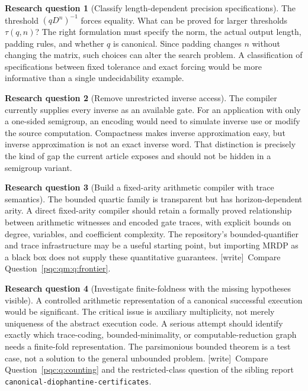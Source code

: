 \documentclass[11pt,letterpaper]{article}
\numberwithin{equation}{section}
\theoremstyle{definition}
\newtheorem{question}{Research question}
\theoremstyle{remark}
\newcommand{\code}[1]{\nolinkurl{#1}}
\newcommand{\wtag}{\textup{[write]}}
\begin{document}
\begin{question}[Classify length-dependent precision specifications]
\label{pqc:dr:q:precision}
The threshold $(qD^n)^{-1}$ forces equality. What can be proved for larger
thresholds $\tau(q,n)$? The right formulation must specify the norm,
the actual output length, padding rules, and whether $q$ is canonical.
Since padding changes $n$ without changing the matrix, such choices can
alter the search problem. A classification of specifications between
fixed tolerance and exact forcing would be more informative than a
single undecidability example.
\end{question}

\begin{question}[Remove unrestricted inverse access]
\label{pqc:dr:q:inverse}
The compiler currently supplies every inverse as an available gate. For
an application with only a one-sided semigroup, an encoding would need
to simulate inverse use or modify the source computation. Compactness
makes inverse approximation easy, but inverse approximation is not an
exact inverse word. That distinction is precisely the kind of gap the
current article exposes and should not be hidden in a semigroup variant.
\end{question}

\begin{question}[Build a fixed-arity arithmetic compiler with trace semantics]
\label{pqc:dr:q:fixedarity}
The bounded quartic family is transparent but has horizon-dependent
arity. A direct fixed-arity compiler should retain a formally proved
relationship between arithmetic witnesses and encoded gate traces,
with explicit bounds on degree, variables, and coefficient complexity.
The repository's bounded-quantifier and trace infrastructure may be a
useful starting point, but importing MRDP as a black box does not
supply these quantitative guarantees.
\wtag\ Compare Question~\ref{pqc:qm:q:frontier}.
\end{question}

\begin{question}[Investigate finite-foldness with the missing hypotheses visible]
\label{pqc:dr:q:finitefold}
A controlled arithmetic representation of a canonical successful
execution would be significant. The critical issue is auxiliary
multiplicity, not merely uniqueness of the abstract execution code.
A serious attempt should identify exactly which trace-coding,
bounded-minimality, or computable-reduction graph needs a finite-fold
representation. The parsimonious bounded theorem is a test case, not a
solution to the general unbounded problem.
\wtag\ Compare Question~\ref{pqc:q:counting} and the restricted-class question
of the sibling report \code{canonical-diophantine-certificates}.
\end{question}
\end{document}
